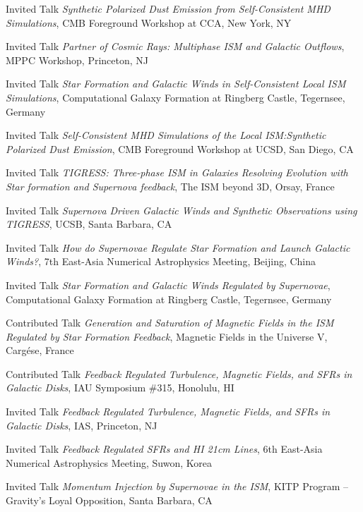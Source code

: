 \documentclass[12pt]{article}
\begin{document}
{Invited Talk}
{\emph{Synthetic Polarized Dust Emission from Self-Consistent MHD Simulations},
CMB Foreground Workshop at CCA,
New York, NY}

{Invited Talk}
{\emph{Partner of Cosmic Rays: Multiphase ISM and Galactic Outflows},
MPPC Workshop,
Princeton, NJ}

{Invited Talk}
{\emph{Star Formation and Galactic Winds in Self-Consistent Local ISM Simulations},
Computational Galaxy Formation at Ringberg Castle,
Tegernsee, Germany}

{Invited Talk}
{\emph{Self-Consistent MHD Simulations of the Local ISM:Synthetic Polarized Dust Emission},
CMB Foreground Workshop at UCSD,
San Diego, CA}

{Invited Talk}
{\emph{TIGRESS: Three-phase ISM in Galaxies Resolving Evolution with Star formation and Supernova feedback},
The ISM beyond 3D,
Orsay, France}

{Invited Talk}
{\emph{Supernova Driven Galactic Winds and Synthetic Observations using TIGRESS},
UCSB,
Santa Barbara, CA}

{Invited Talk}
{\emph{How do Supernovae Regulate Star Formation and Launch Galactic Winds?},
7th East-Asia Numerical Astrophysics Meeting,
Beijing, China}

{Invited Talk}
{\emph{Star Formation and Galactic Winds Regulated by Supernovae},
Computational Galaxy Formation at Ringberg Castle,
Tegernsee, Germany}

{Contributed Talk}
{\emph{Generation and Saturation of Magnetic Fields in the ISM Regulated by Star Formation Feedback},
Magnetic Fields in the Universe V,
Carg\'ese, France}

{Contributed Talk}
{\emph{Feedback Regulated Turbulence, Magnetic Fields, and SFRs in Galactic Disks},
IAU Symposium \#315,
Honolulu, HI}

{Invited Talk}
{\emph{Feedback Regulated Turbulence, Magnetic Fields, and SFRs in Galactic Disks},
IAS,
Princeton, NJ}

{Invited Talk}
{\emph{Feedback Regulated SFRs and HI 21cm Lines},
6th East-Asia Numerical Astrophysics Meeting,
Suwon, Korea}

{Invited Talk}
{\emph{Momentum Injection by Supernovae in the ISM},
KITP Program -- Gravity's Loyal Opposition,
Santa Barbara, CA}
\end{document}
